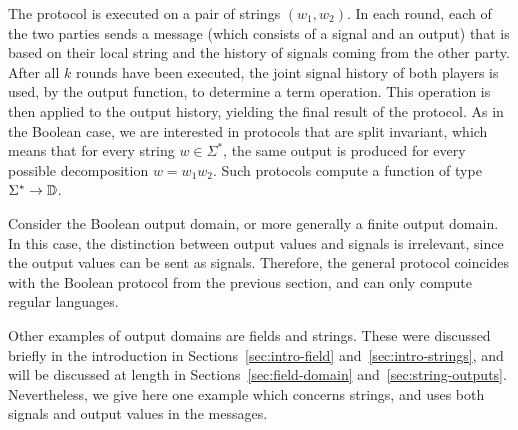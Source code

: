 The protocol is executed on a pair of strings $(w_1,w_2)$. In each round, each of the two parties  sends a message (which consists of a signal and an output) that is based on their local string and the history of signals coming from the other party. After all $k$ rounds have been executed, the joint signal history of both players is used, by the output function, to determine a term operation. This operation is then applied to the output history, yielding the final result of the protocol. As in the Boolean case, we are interested in protocols that are split invariant, which means that for every string $w \in \Sigma^*$, the same output is produced for every possible decomposition $w = w_1 w_2$. Such protocols compute a function of type $\Sigma^* \to \mathbb D$. 

\begin{myexample}
    Consider the Boolean output domain, or more generally a finite output domain. In this case, the distinction between output values and signals is irrelevant, since the output values can be sent as signals. Therefore, the general protocol coincides with the Boolean protocol from the previous section, and  can only compute regular languages. 
\end{myexample}

Other examples of output domains are fields and strings. These were discussed  briefly in the introduction in Sections~\ref{sec:intro-field} and~\ref{sec:intro-strings},  and will be discussed at length in Sections~\ref{sec:field-domain} and~\ref{sec:string-outputs}.  Nevertheless, we give here one example which concerns strings, and uses both signals and output values in the messages.

